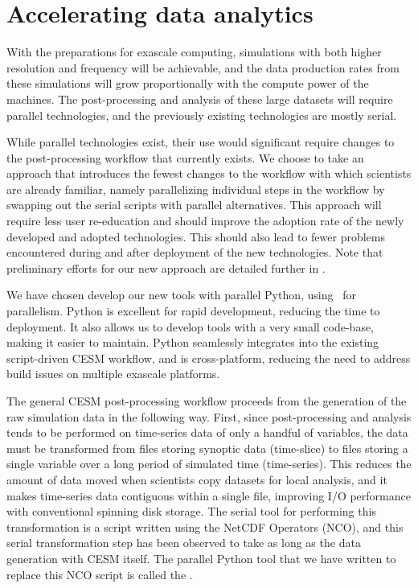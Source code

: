 \section{Accelerating data analytics }\label{sec:postproc}

With the preparations for exascale computing, simulations with both higher resolution and frequency will be achievable, and the data production rates from these simulations will grow proportionally with the compute power of the machines.  The post-processing and analysis of these large datasets will require parallel technologies, and the previously existing technologies are mostly serial.  

While parallel technologies exist, their use would significant require changes to the post-processing workflow that currently exists.  We choose to take an approach that introduces the fewest changes to the workflow with which scientists are already familiar, namely parallelizing individual steps in the workflow by swapping out the serial scripts with parallel alternatives.  This approach will require less user re-education and should improve the adoption rate of the newly developed and adopted technologies.  This should also lead to fewer problems encountered during and after deployment of the new technologies. Note that preliminary efforts for our new approach are detailed further in \cite{paul20215}.

We have chosen develop our new tools with parallel Python, using \mpipy\ for parallelism.  Python is excellent for rapid development, reducing the time to deployment.  It also allows us to develop tools with a very small code-base, making it easier to maintain.  Python seamlessly integrates into the existing script-driven CESM workflow, and is cross-platform, reducing the need to address build issues on multiple exascale platforms.

The general CESM post-processing workflow proceeds from the generation of the raw simulation data in the following way.  First, since post-processing and analysis tends to be performed on time-series data of only a handful of variables, the data must be transformed from files storing synoptic data (time-slice) to files storing a single variable over a long period of simulated time (time-series).  This reduces the amount of data moved when scientists copy datasets for local analysis, and it makes time-series data contiguous within a single file, improving I/O performance with conventional spinning disk storage.  The serial tool for performing this transformation is a script written using the NetCDF Operators (NCO), and this serial transformation step has been observed to take as long as the data generation with CESM itself.  The parallel Python tool that we have written to replace this NCO script is called the \pyreshaper.

